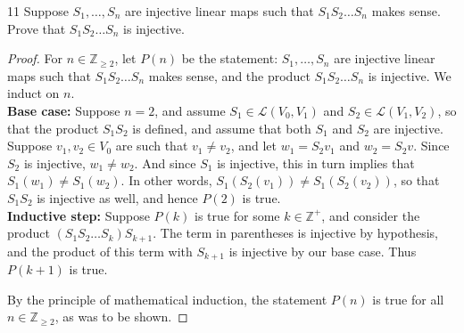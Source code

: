\documentclass{extarticle}
\newenvironment{problem}[1]{\begin{prob*}{#1}{}}{\end{prob*}}
\newcommand{\Z}{\mathbb{Z}}
\newcommand{\Hom}{\mathcal{L}}
\begin{document}
\begin{problem}{11}
Suppose $S_1,\dots,S_n$ are injective linear maps such that $S_1S_2\dots S_n$ makes sense.  Prove that $S_1S_2\dots S_n$ is injective.
\end{problem}
\begin{proof}
For $n\in\Z_{\geq 2}$, let $P(n)$ be the statement: $S_1,\dots, S_n$ are injective linear maps such that $S_1S_2\dots S_n$ makes sense, and the product $S_1S_2\dots S_n$ is injective.  We induct on $n$.\\
\textbf{Base case:} Suppose $n =2$, and assume $S_1\in\Hom(V_0,V_1)$ and $S_2\in\Hom(V_1,V_2)$, so that the product $S_1S_2$ is defined, and assume that both $S_1$ and $S_2$ are injective.  Suppose $v_1,v_2\in V_0$ are such that $v_1\neq v_2$, and let $w_1 = S_2v_1$ and $w_2 = S_2v$.  Since $S_2$ is injective, $w_1\neq w_2$.  And since $S_1$ is injective, this in turn implies that $S_1(w_1)\neq S_1(w_2)$.  In other words, $S_1(S_2(v_1)) \neq S_1(S_2(v_2))$, so that $S_1S_2$ is injective as well, and hence $P(2)$ is true.\\
\textbf{Inductive step:} Suppose $P(k)$ is true for some $k\in\Z^+$, and consider the product $(S_1S_2\dots S_{k})S_{k+1}$.  The term in parentheses is injective by hypothesis, and the product of this term with $S_{k+1}$ is injective by our base case.  Thus $P(k+1)$ is true.
\par By the principle of mathematical induction, the statement $P(n)$ is true for all $n\in\Z_{\geq 2}$, as was to be shown.
\end{proof}
\end{document}
